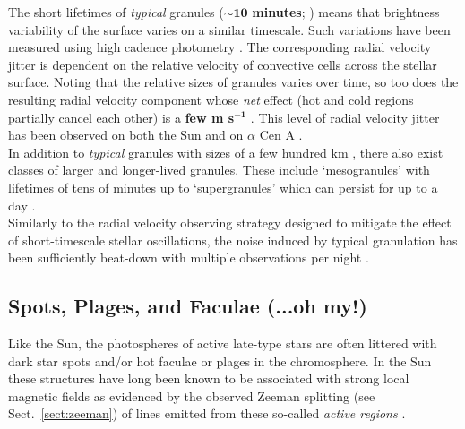 The short lifetimes of \emph{typical} granules ($\mathbf{\sim 10}$ \textbf{minutes}; 
\cite{hall08}) means that brightness variability of the surface varies on a similar timescale. 
Such variations have been measured using high cadence photometry \parencite[e.g.][]{gilliland11}.
The corresponding radial velocity jitter is dependent on the relative velocity of convective 
cells across the stellar surface. Noting that the relative sizes of granules varies over time, so 
too does the resulting radial velocity component whose \emph{net} effect (hot and cold regions partially 
cancel each other) is a \textbf{few m s$^{\mathbf{-1}}$} \parencite{lindegren03}. This level of radial 
velocity jitter has been observed on both the Sun \parencite{kuhn83} and on $\alpha$ Cen A 
\parencite{kjeldsen99}. \\

In addition to \emph{typical} granules with sizes of a few hundred km \parencite{hall08}, there 
also exist classes of larger and longer-lived granules. These include `mesogranules' with lifetimes of 
tens of minutes \parencite{roudier98} up to `supergranules' which can persist for up to a day 
\parencite{delmoro04}. \\

Similarly to the radial velocity observing strategy designed to mitigate the effect of short-timescale 
stellar oscillations, the noise induced by typical granulation has been sufficiently beat-down with multiple 
observations per night \parencite{lovis05, dumusque11}.

\subsection{Spots, Plages, and Faculae (...oh my!)}
Like the Sun, the photospheres of active late-type stars are often littered with dark star spots 
and/or hot faculae or plages in the chromosphere. In the Sun these structures have long been known to 
be associated with strong local magnetic fields as evidenced by the observed Zeeman splitting 
(see Sect.~\ref{sect:zeeman}) of lines emitted from these so-called \emph{active regions} 
\parencite{hale08}. 

